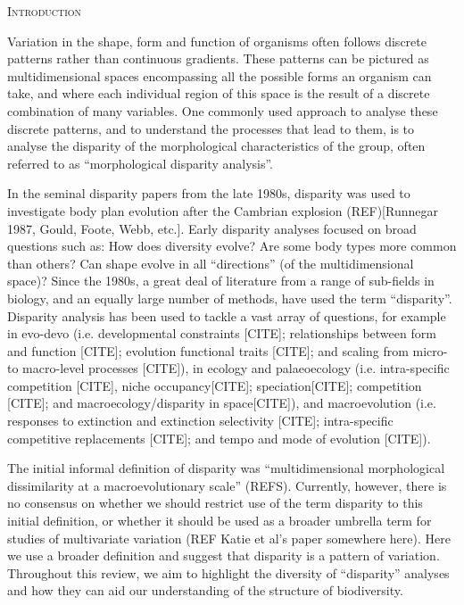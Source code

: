 \documentclass[12pt,letterpaper]{article}
\renewcommand{\section}[1]{%
\bigskip
\begin{center}
\begin{Large}
\normalfont\scshape #1
\medskip
\end{Large}
\end{center}}
\begin{document}
\section{Introduction}

Variation in the shape, form and function of organisms often follows discrete patterns rather than continuous gradients.
These patterns can be pictured as multidimensional spaces encompassing all the possible forms an organism can take, and where each individual region of this space is the result of a discrete combination of many variables.
One commonly used approach to analyse these discrete patterns, and to understand the processes that lead to them, is to analyse the disparity of the morphological characteristics of the group, often referred to as ``morphological disparity analysis''.

In the seminal disparity papers from the late 1980s, disparity was used to investigate body plan evolution after the Cambrian explosion (REF)[Runnegar 1987, Gould, Foote, Webb, etc.].
Early disparity analyses focused on broad questions such as: How does diversity evolve? Are some body types more common than others? Can shape evolve in all ``directions'' (of the multidimensional space)?
Since the 1980s, a great deal of literature from a range of sub-fields in biology, and an equally large number of methods, have used the term ``disparity''.
Disparity analysis has been used to tackle a vast array of questions, for example in evo-devo (i.e. developmental constraints [CITE]; relationships between form and function [CITE]; evolution functional traits [CITE]; and scaling from micro- to macro-level processes [CITE]), in ecology and palaeoecology (i.e. intra-specific competition [CITE], niche occupancy[CITE]; speciation[CITE]; competition [CITE]; and macroecology/disparity in space[CITE]), and macroevolution (i.e. responses to extinction and extinction selectivity [CITE]; intra-specific competitive replacements [CITE]; and tempo and mode of evolution [CITE]).

The initial informal definition of disparity was ``multidimensional morphological dissimilarity at a macroevolutionary scale'' (REFS).
Currently, however, there is no consensus on whether we should restrict use of the term disparity to this initial definition, or whether it should be used as a broader umbrella term for studies of multivariate variation (REF Katie et al's paper somewhere here). 
Here we use a broader definition and suggest that disparity is a pattern of variation.
Throughout this review, we aim to highlight the diversity of ``disparity'' analyses and how they can aid our understanding of the structure of biodiversity.
\end{document}
